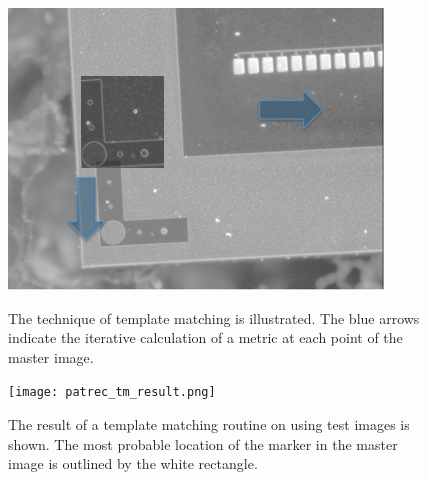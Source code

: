 \documentclass[fleqn,10pt]{SelfArx} %
\begin{document}
\begin{figure}[!tbp]
  \centering
  \begin{minipage}[b]{0.23\textwidth}
    \includegraphics[width=\textwidth]{templatematching.png}
    \caption{The technique of template matching is illustrated. The blue arrows indicate the iterative calculation of a metric at each point of the master image.}
    \label{fig:templatematching}
  \end{minipage}
  \begin{minipage}[b]{0.23\textwidth}
    \texttt{[image: patrec\_tm\_result.png]}
    \caption{The result of a template matching routine on using test images is shown. The most probable location of the marker in the master image is outlined by the white rectangle.}
        \label{fig:templatematchingresult}
  \end{minipage}
\end{figure}
\end{document}
